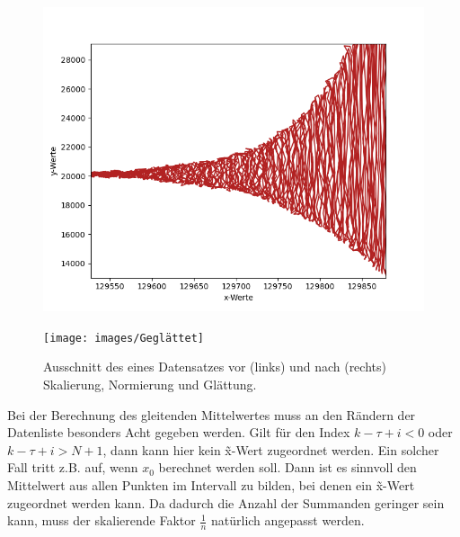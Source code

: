 \begin{figure}[htb]
    \centering
    \begin{minipage}{.5\textwidth}
        \centering
        \includegraphics[width=\linewidth]{images/EingabeNichtGlatt}
    \end{minipage}%
    \begin{minipage}{.5\textwidth}
        \centering
        \texttt{[image: images/Geglättet]}
    \end{minipage}
    \caption{Ausschnitt des eines Datensatzes vor (links) und nach (rechts) Skalierung, Normierung und Glättung.}
    \label{fig:glaettung}
\end{figure}
Bei der Berechnung des gleitenden Mittelwertes muss an den Rändern der Datenliste besonders Acht gegeben werden.
Gilt für den Index $k-\tau+i < 0$ oder $k-\tau+i > N + 1$, dann kann hier kein \~x-Wert zugeordnet werden.
Ein solcher Fall tritt z.B. auf, wenn $x_0$ berechnet werden soll.
Dann ist es sinnvoll den Mittelwert aus allen Punkten im Intervall zu bilden, bei denen ein \~x-Wert zugeordnet werden kann.
Da dadurch die Anzahl der Summanden geringer sein kann, muss der skalierende Faktor $\frac{1}{n}$ natürlich angepasst werden.



